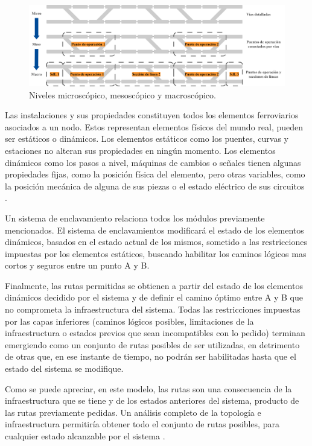     \begin{figure}[H]
        \centering
        \includegraphics[width=1\textwidth]{Figuras/railtopomodel}
        \centering\caption{Niveles microscópico, mesoscópico y macroscópico.}
        \label{fig:RTM_2}
    \end{figure}
    
    Las instalaciones y sus propiedades constituyen todos los elementos ferroviarios asociados a un nodo. Estos representan elementos físicos del mundo real, pueden ser estáticos o dinámicos. Los elementos estáticos como los puentes, curvas y estaciones no alteran sus propiedades en ningún momento. Los elementos dinámicos como los pasos a nivel, máquinas de cambios o señales tienen algunas propiedades fijas, como la posición física del elemento, pero otras variables, como la posición mecánica de alguna de sus piezas o el estado eléctrico de sus circuitos \cite{Paper_146,Paper_150}.

    Un sistema de enclavamiento relaciona todos los módulos previamente mencionados. El sistema de enclavamientos modificará el estado de los elementos dinámicos, basados en el estado actual de los mismos, sometido a las restricciones impuestas por los elementos estáticos, buscando habilitar los caminos lógicos mas cortos y seguros entre un punto A y B.

    Finalmente, las rutas permitidas se obtienen a partir del estado de los elementos dinámicos decidido por el sistema y de definir el camino óptimo entre A y B que no comprometa la infraestructura del sistema. Todas las restricciones impuestas por las capas inferiores (caminos lógicos posibles, limitaciones de la infraestructura o estados previos que sean incompatibles con lo pedido) terminan emergiendo como un conjunto de rutas posibles de ser utilizadas, en detrimento de otras que, en ese instante de tiempo, no podrán ser habilitadas hasta que el estado del sistema se modifique.

    Como se puede apreciar, en este modelo, las rutas son una consecuencia de la infraestructura que se tiene y de los estados anteriores del sistema, producto de las rutas previamente pedidas. Un análisis completo de la topología e infraestructura permitiría obtener todo el conjunto de rutas posibles, para cualquier estado alcanzable por el sistema \cite{Paper_150}.